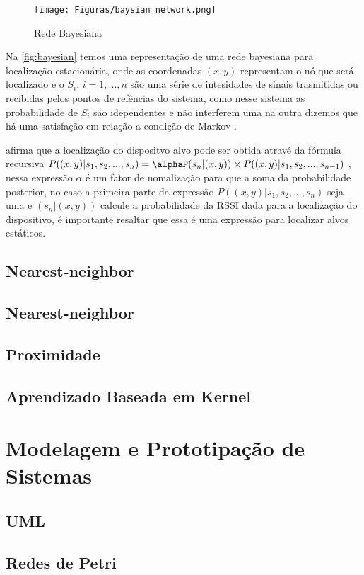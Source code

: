    \begin{figure}[H]
              \caption{\label{fig:bayesian}{Rede Bayesiana}}
              \centering
              \texttt{[image: Figuras/baysian network.png]}
        \end{figure}

        Na \autoref{fig:bayesian} temos uma representação de uma rede bayesiana para localização estacionária, onde as coordenadas $(x,y)$ representam o nó que será localizado e o $S_i$, $i=1,...,n$ são uma série de intesidades de sinais trasmitidas ou recibidas pelos pontos de refências do sistema, como nesse sistema as probabilidade de $S_i$ são idependentes e não interferem uma na outra dizemos que há uma satisfação em relação a condição de Markov \cite{rfid2009review}.
        \par
        \citeauthor{rfid2009review} afirma que a localização do dispositvo alvo pode ser obtida atravé da fórmula recursiva 
        $P((x,y) | s_1, s_2, ..., s_n) = \alphaP(s_n | (x,y)) \times P((x,y) | s_1,s_2, ...,s_{n-1})$
        , nessa expressão $\alpha$ é um fator de nomalização para que a soma da probabilidade posterior, no caso a primeira parte da expressão $P((x,y) | s_1, s_2, ..., s_n)$ seja uma e $(s_n | (x,y))$ calcule a probabilidade da RSSI dada para a localização do dispositivo, é importante resaltar que essa é uma expressão para localizar alvos estáticos. 
    \subsection{Nearest-neighbor}
    \subsection{Nearest-neighbor}
    \subsection{Proximidade}
    \subsection{Aprendizado Baseada em Kernel}
\section{Modelagem e Prototipação de Sistemas}
    \subsection{UML}
    \subsection{Redes de Petri}